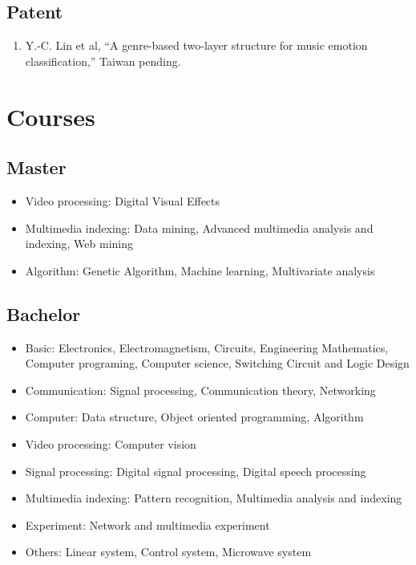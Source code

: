 \documentclass{res}
\begin{document}
\begin{CJK}{UTF8}{bsmi}
\begin{resume}
	\subsection{Patent}
		\begin{enumerate}[1.~]
			\item Y.-C. Lin et al, “A genre-based two-layer structure for music emotion classification,” Taiwan pending.
		\end{enumerate}

\section{Courses}
	\vspace{-0.1in}
	\subsection{Master}
		\begin{itemize}
			\item Video processing: Digital Visual Effects
			\item Multimedia indexing: Data mining, Advanced multimedia analysis and indexing, Web mining
			\item Algorithm: Genetic Algorithm, Machine learning, Multivariate analysis
		\end{itemize}

	\subsection{Bachelor}
		\begin{itemize}
			\item Basic: Electronics, Electromagnetism, Circuits, Engineering Mathematics, Computer programing, Computer science, Switching Circuit and Logic Design
			\item Communication: Signal processing, Communication theory, Networking
			\item Computer: Data structure, Object oriented programming, Algorithm
			\item Video processing: Computer vision
			\item Signal processing: Digital signal processing, Digital speech processing
			\item Multimedia indexing: Pattern recognition, Multimedia analysis and indexing
			\item Experiment: Network and multimedia experiment
			\item Others: Linear system, Control system, Microwave system
		\end{itemize}


\end{resume}
\end{CJK}
\end{document}

